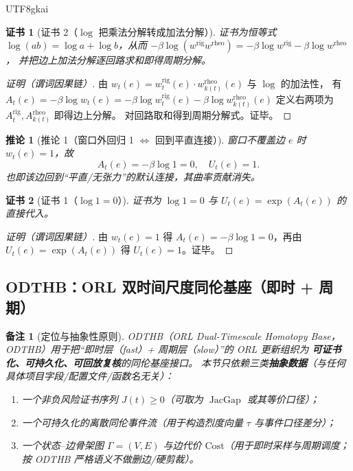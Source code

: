 \documentclass[12pt]{article}
\newtheorem{corollary}{推论}[section]
\newtheorem{remark}{备注}[section]
\newtheorem{Certificate}{证书}[section]
\newcommand{\JacGap}{\operatorname{JacGap}}
\newcommand{\ORLDTHBase}{\textsf{ODTHB}}
\begin{document}
\begin{CJK*}{UTF8}{gkai}
\begin{Certificate}[证书 2（$\log$ 把乘法分解转成加法分解）]
\label{cert:tex27-ch5-p2}
证书为恒等式 $\log(ab)=\log a+\log b$，从而
$-\beta\log(w^{\mathrm{rig}}w^{\mathrm{rheo}})=-\beta\log w^{\mathrm{rig}}-\beta\log w^{\mathrm{rheo}}$，
并把边上加法分解逐回路求和即得周期分解。
\end{Certificate}

\begin{proof}[证明（谓词因果链）]
由 $w_t(e)=w^{\mathrm{rig}}_t(e)\cdot w^{\mathrm{rheo}}_{k(t)}(e)$ 与 $\log$ 的加法性，
有
$
A_t(e)=-\beta\log w_t(e)=-\beta\log w^{\mathrm{rig}}_t(e)-\beta\log w^{\mathrm{rheo}}_{k(t)}(e)
$
定义右两项为 $A^{\mathrm{rig}}_t,A^{\mathrm{rheo}}_{k(t)}$ 即得边上分解。
对回路取和得到周期分解式。证毕。
\end{proof}

\begin{corollary}[推论 1（窗口外回归 1 $\Leftrightarrow$ 回到平直连接）]
\label{cor:tex27-ch5-c1}
窗口不覆盖边 $e$ 时 $w_t(e)=1$，故
\[
  A_t(e)=-\beta\log 1=0,\quad U_t(e)=1.
\]
也即该边回到“平直/无张力”的默认连接，其曲率贡献消失。
\end{corollary}

\begin{Certificate}[证书 1（$\log 1=0$）]
\label{cert:tex27-ch5-c1}
证书为 $\log 1=0$ 与 $U_t(e)=\exp(A_t(e))$ 的直接代入。
\end{Certificate}

\begin{proof}[证明（谓词因果链）]
由 $w_t(e)=1$ 得 $A_t(e)=-\beta\log 1=0$，再由 $U_t(e)=\exp(A_t(e))$ 得 $U_t(e)=1$。证毕。
\end{proof}

\subsection{\ORLDTHBase：ORL 双时间尺度同伦基座（即时 + 周期）}
\label{subsec:tex27-ch5-odthb}

\begin{remark}[定位与抽象性原则]
\ORLDTHBase（\emph{ORL Dual-Timescale Homotopy Base}，ODTHB）用于把“即时层（fast）+ 周期层（slow）”的 ORL 更新组织为
\textbf{可证书化、可持久化、可回放复核}的同伦基座接口。
本节只依赖三类\textbf{抽象数据}（与任何具体项目字段/配置文件/函数名无关）：
\begin{enumerate}
  \item 一个非负风险证书序列 $J(t)\ge 0$（可取为 $\JacGap$ 或其等价口径）；
  \item 一个可持久化的离散同伦事件流（用于构造烈度向量 $\tau$ 与事件口径差分）；
  \item 一个状态--边骨架图 $\Gamma=(V,E)$ 与边代价 $\mathrm{Cost}$（用于即时采样与周期调度；按 ODTHB 严格语义不做删边/硬剪裁）。
\end{enumerate}
\end{remark}


\end{CJK*}
\end{document}
